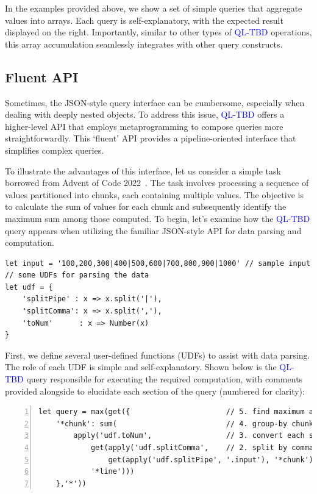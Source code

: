 \documentclass[runningheads]{llncs}
\newcommand{\lang}{\textcolor{blue}{QL-TBD}}
\begin{document}
In the examples provided above, we show a set of simple queries that aggregate values
into arrays.
Each query is self-explanatory, with the expected result displayed on the right.
Importantly, similar to other types of \lang{} operations, this array accumulation
seamlessly integrates with other query constructs.

\subsection{Fluent API}
Sometimes, the JSON-style query interface can be cumbersome,
especially when dealing with deeply nested objects.
To address this issue, \lang{} offers a higher-level API that employs
metaprogramming to compose queries more straightforwardly.
This `fluent' API provides a pipeline-oriented interface that
simplifies complex queries.

To illustrate the advantages of this interface, let us consider a
simple task borrowed from Advent of Code 2022~\cite{adventofcode22}.
The task involves processing a sequence of values partitioned into chunks,
each containing multiple values.
The objective is to calculate the sum of values for each chunk and
subsequently identify the maximum sum among those computed.
To begin, let's examine how the \lang{} query appears when utilizing
the familiar JSON-style API for data parsing and computation.


\begin{lstlisting}[style=JavaScript, columns=flexible]
let input = '100,200,300|400|500,600|700,800,900|1000' // sample input
// some UDFs for parsing the data
let udf = {
    'splitPipe' : x => x.split('|'),
    'splitComma': x => x.split(','),
    'toNum'      : x => Number(x)
}
\end{lstlisting}

First, we define several user-defined functions (UDFs) to assist with data parsing.
The role of each UDF is simple and self-explanatory.
Shown below is the \lang{} query responsible for executing the required
computation, with comments provided alongside to elucidate each section
of the query (numbered for clarity):

\begin{lstlisting}[style=JavaScript, columns=flexible, numbers=left]
let query = max(get({                      // 5. find maximum among group sums
    '*chunk': sum(                         // 4. group-by chunk and compute sum
        apply('udf.toNum',                 // 3. convert each string number to a number object
            get(apply('udf.splitComma',    // 2. split by comma to get numbers of each chunk
                get(apply('udf.splitPipe', '.input'), '*chunk')), // 1. split into chunks
            '*line')))
    },'*'))
\end{lstlisting}
\end{document}
